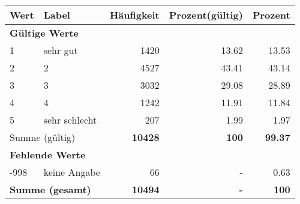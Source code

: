      \begin{longtable}{lXrrr}
     \toprule
     \textbf{Wert} & \textbf{Label} & \textbf{Häufigkeit} & \textbf{Prozent(gültig)} & \textbf{Prozent} \\
     \endhead
     \midrule
     \multicolumn{5}{l}{\textbf{Gültige Werte}}\\

     1 &
     \multicolumn{1}{X}{ sehr gut   } &


       \num{1420} &
       \num[round-mode=places,round-precision=2]{13,62} &
         \num[round-mode=places,round-precision=2]{13,53} \\

     2 &
     \multicolumn{1}{X}{ 2   } &


       \num{4527} &
       \num[round-mode=places,round-precision=2]{43,41} &
         \num[round-mode=places,round-precision=2]{43,14} \\

     3 &
     \multicolumn{1}{X}{ 3   } &


       \num{3032} &
       \num[round-mode=places,round-precision=2]{29,08} &
         \num[round-mode=places,round-precision=2]{28,89} \\

     4 &
     \multicolumn{1}{X}{ 4   } &


       \num{1242} &
       \num[round-mode=places,round-precision=2]{11,91} &
         \num[round-mode=places,round-precision=2]{11,84} \\

     5 &
     \multicolumn{1}{X}{ sehr schlecht   } &


       \num{207} &
       \num[round-mode=places,round-precision=2]{1,99} &
         \num[round-mode=places,round-precision=2]{1,97} \\
     \midrule
     \multicolumn{2}{l}{Summe (gültig)} &
       \textbf{\num{10428}} &
     \textbf{100} &
       \textbf{\num[round-mode=places,round-precision=2]{99,37}} \\
     \multicolumn{5}{l}{\textbf{Fehlende Werte}}\\
       -998 &
       keine Angabe &
         \num{66} &
        - &
         \num[round-mode=places,round-precision=2]{0,63} \\
     \midrule
     \multicolumn{2}{l}{\textbf{Summe (gesamt)}} &
          \textbf{\num{10494}} &
        \textbf{-} &
        \textbf{100} \\
     \bottomrule
     \end{longtable}
     
